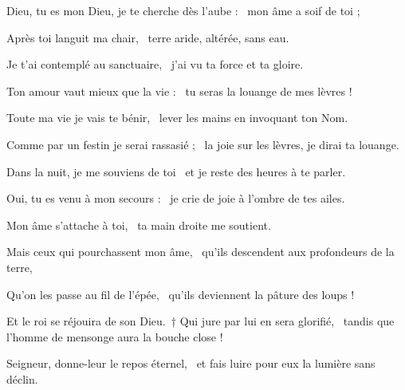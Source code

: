 \item Dieu, tu es mon Dieu, je te cherche dès l'aube :~\psstar{} mon âme a soif de toi ;

\item Après toi languit ma chair,~\psstar{} terre aride, altérée, sans eau.

\item Je t'ai contemplé au sanctuaire,~\psstar{} j'ai vu ta force et ta gloire.

\item Ton amour vaut mieux que la vie :~\psstar{} tu seras la louange de mes lèvres !

\item Toute ma vie je vais te bénir,~\psstar{} lever les mains en invoquant ton Nom.

\item Comme par un festin je serai rassasié ;~\psstar{} la joie sur les lèvres, je dirai ta louange.

\item Dans la nuit, je me souviens de toi~\psstar{} et je reste des heures à te parler.

\item Oui, tu es venu à mon secours :~\psstar{} je crie de joie à l'ombre de tes ailes.

\item Mon âme s'attache à toi,~\psstar{} ta main droite me soutient.

\item Mais ceux qui pourchassent mon âme,~\psstar{} qu'ils descendent aux profondeurs de la terre,

\item Qu'on les passe au fil de l'épée,~\psstar{} qu'ils deviennent la pâture des loups !

\item Et le roi se réjouira de son Dieu.~† Qui jure par lui en sera glorifié,~\psstar{} tandis que l'homme de mensonge aura la bouche close !

\item Seigneur, donne-leur le repos éternel,~\psstar{} et fais luire pour eux la lumière sans déclin.